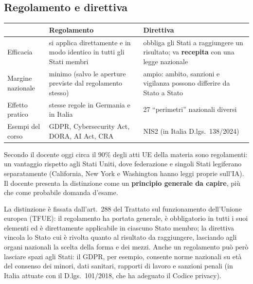 \subsection{Regolamento e direttiva}
\label{sec:intro-reg-dir}
\begin{center}
\small
\begin{tabularx}{\linewidth}{>{\raggedright\arraybackslash}p{3cm} X X}
\toprule
 & \textbf{Regolamento} & \textbf{Direttiva}\\
\midrule
Efficacia & si applica direttamente e in modo identico in tutti gli Stati membri & obbliga gli Stati a
  raggiungere un risultato; va \textbf{recepita} con una legge nazionale\\
Margine nazionale & minimo (salvo le aperture previste dal regolamento stesso) & ampio: ambito, sanzioni e
  vigilanza possono differire da Stato a Stato\\
Effetto pratico & stesse regole in Germania e in Italia & 27 ``perimetri'' nazionali diversi\\
Esempi del corso & GDPR, Cybersecurity Act, DORA, AI Act, CRA & NIS2 (in Italia D.lgs.~138/2024)\\
\bottomrule
\end{tabularx}
\end{center}
Secondo il docente oggi circa il 90\% degli atti UE della materia sono regolamenti: un vantaggio
rispetto agli Stati Uniti, dove federazione e singoli Stati legiferano separatamente (California, New
York e Washington hanno leggi proprie sull'IA). Il docente presenta la distinzione come un
\textbf{principio generale da capire}, più che come probabile domanda d'esame.

\begin{integrazione}
La distinzione è fissata dall'art.~288 del Trattato sul funzionamento dell'Unione europea (TFUE): il
regolamento ha portata generale, è obbligatorio in tutti i suoi elementi ed è direttamente applicabile
in ciascuno Stato membro; la direttiva vincola lo Stato cui è rivolta quanto al risultato da
raggiungere, lasciando agli organi nazionali la scelta della forma e dei mezzi. Anche
un regolamento può però lasciare spazi agli Stati: il GDPR, per esempio, consente norme nazionali su età
del consenso dei minori, dati sanitari, rapporti di lavoro e sanzioni penali (in Italia attuate con il
D.lgs.~101/2018, che ha adeguato il Codice privacy).
\end{integrazione}

